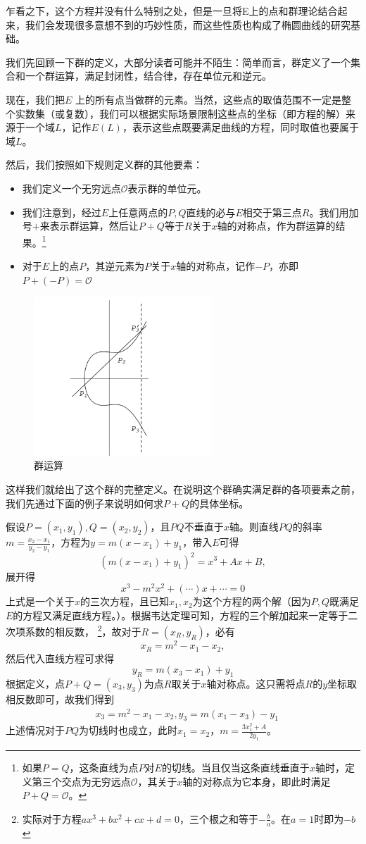 \documentclass[12pt]{article}
\newcommand{\ec}{椭圆曲线}
\newcommand{\oo}{\mathcal{O}}
\begin{document}
乍看之下，这个方程并没有什么特别之处，但是一旦将E上的点和群理论结合起来，我们会发现很多意想不到的巧妙性质，而这些性质也构成了\ec 的研究基础。

我们先回顾一下群的定义，大部分读者可能并不陌生：简单而言，群定义了一个集合和一个群运算，满足封闭性，结合律，存在单位元和逆元。

现在，我们把$E$ 上的所有点当做群的元素。当然，这些点的取值范围不一定是整个实数集（或复数），我们可以根据实际场景限制这些点的坐标（即方程的解）来源于一个域$L$，记作$E(L)$，表示这些点既要满足曲线的方程，同时取值也要属于域$L$。

然后，我们按照如下规则定义群的其他要素：
\begin{itemize}
	\item 我们定义一个无穷远点$\mathcal{O}$表示群的单位元。
	\item 我们注意到，经过$E$上任意两点的$P,Q$直线的必与$E$相交于第三点$R$。我们用加号$+$来表示群运算，然后让$P+Q$等于$R$关于$x$轴的对称点，作为群运算的结果。\footnote{如果$P=Q$，这条直线为点$P$对$E$的切线。当且仅当这条直线垂直于$x$轴时，定义第三个交点为无穷远点$\oo$，其关于$x$轴的对称点为它本身，即此时满足$P+Q=\oo$。}
	\item 对于$E$上的点$P$，其逆元素为$P$关于$x$轴的对称点，记作$-P$，亦即$P+(-P)=\mathcal{O}$
\end{itemize}
\begin{figure}[H]
	\centering
	\label{fig:grouplaw}
	\includegraphics[width=0.6\textwidth]{../common/grouplaw.png}
	\caption{群运算}
\end{figure}
这样我们就给出了这个群的完整定义。在说明这个群确实满足群的各项要素之前，我们先通过下面的例子来说明如何求$P+Q$的具体坐标。

假设$P=(x_1,y_1),Q=(x_2,y_2)$，且$PQ$不垂直于$x$轴。则直线$PQ$的斜率$m=\frac{x_2-x_1}{y_2-y_1}$，方程为$y=m(x-x_1)+y_1$，带入$E$可得
$$(m(x-x_1)+y_1)^2=x^3+Ax+B,$$
展开得
$$x^3-m^2x^2+(\cdots)x+\cdots=0$$
上式是一个关于$x$的三次方程，且已知$x_1,x_2$为这个方程的两个解（因为$P,Q$既满足$E$的方程又满足直线方程。）。根据韦达定理可知，方程的三个解加起来一定等于二次项系数的相反数， \footnote{实际对于方程$ax^3+bx^2+cx+d=0$，三个根之和等于$-\frac{b}{a}$。在$a=1$时即为$-b$}，故对于$R=(x_R,y_R)$，必有
$$x_R=m^2-x_1-x_2,$$
然后代入直线方程可求得
$$y_R=m(x_3-x_1)+y_1$$
根据定义，点$P+Q=(x_3,y_3)$为点$R$取关于$x$轴对称点。这只需将点$R$的$y$坐标取相反数即可，故我们得到
\begin{align}
\label{groupop}
& x_3 = m^2-x_1-x_2, y_3 = m(x_1-x_3)-y_1
\end{align}
上述情况对于$PQ$为切线时也成立，此时$x_1=x_2$，$m=\frac{3x_1^2+A}{2y_1}$。
\end{document}
